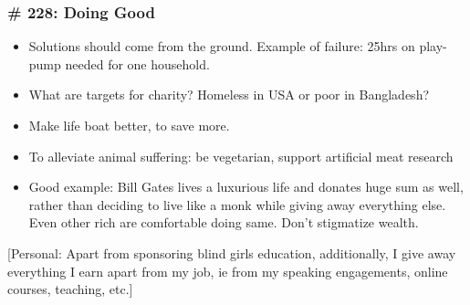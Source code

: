 \begin{frame}[fragile]
\frametitle{\# 228: Doing Good}

\begin{itemize}
	\item Solutions should come from the ground. Example of failure: 25hrs on play-pump needed for one household.
	\item  What are targets for charity? Homeless in USA or poor in Bangladesh?
	\item  Make life boat better, to save more.
	\item  To alleviate animal suffering: be vegetarian, support artificial meat research
	\item  Good example: Bill Gates lives a luxurious life and donates huge sum as well, rather than deciding to live like a monk while giving away everything else. Even other rich are comfortable doing same. Don't stigmatize wealth.
	\end{itemize}

[Personal: Apart from sponsoring blind girls education, additionally, I give away everything I earn apart from my job, ie from my speaking engagements, online courses, teaching, etc.]
\end{frame}


